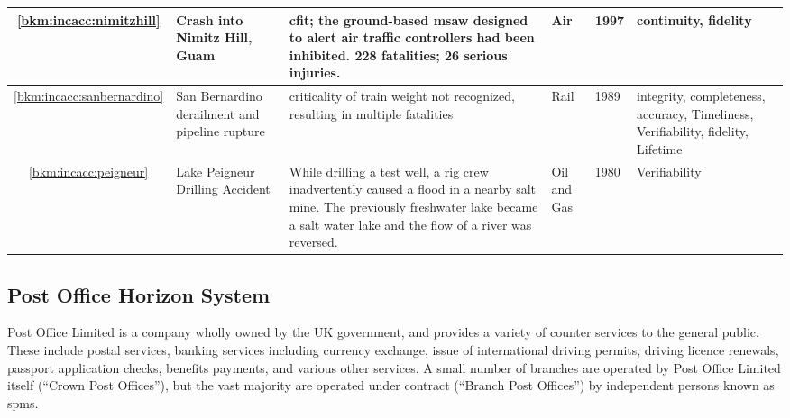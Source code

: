 \begin{longtable}{|C{}|L{}|L{}|L{}|L{}|L{}|}
	\hline
	\ref{bkm:incacc:nimitzhill} & Crash into Nimitz Hill, Guam & \Gls{cfit}; the ground-based \gls{msaw} designed to alert air traffic controllers had been inhibited. 228 fatalities; 26 serious injuries. & Air & 1997 & \Gls{continuity}, \gls{fidelity}\\
	\hline
        \ref{bkm:incacc:sanbernardino} &
        San Bernardino  derailment and pipeline rupture & \Gls{criticality} of train weight not recognized,
        resulting in multiple fatalities &
        Rail & 1989 & \Gls{integrity}, \gls{completeness}, \gls{accuracy}, Timeliness, Verifiability, \gls{fidelity}, Lifetime \\
        \hline
	\ref{bkm:incacc:peigneur} & Lake Peigneur Drilling Accident & While drilling a test well, a rig crew inadvertently caused a flood in a nearby salt mine. The previously freshwater lake became a salt water lake and the flow of a river was reversed. & Oil and Gas & 1980 & Verifiability \\
	\hline

\end{longtable}

\subsection{Post Office Horizon System}\label{bkm:incacc:horizon}
Post Office Limited is a company wholly owned by the UK government, and provides a variety of counter services to the general public. These include postal services, banking services including currency exchange, issue of international driving permits, driving licence renewals, passport application checks, benefits payments, and various other services. A small number of branches are operated by Post Office Limited itself (``Crown Post Offices''), but the vast majority are operated under contract (``Branch Post Offices'') by independent persons known as \glspl{spm}.

